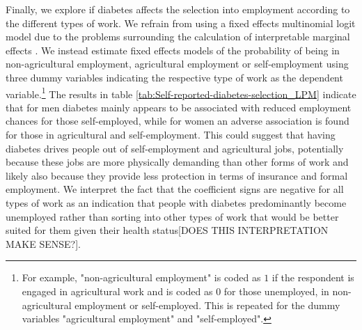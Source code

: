 \documentclass[12pt,english,british]{article}
\begin{document}
Finally, we explore if diabetes affects the selection into employment according to the different types of work. We refrain from using a fixed effects multinomial logit model due to the problems surrounding the calculation of interpretable marginal effects \citep{Pforr2014}. We instead estimate fixed effects models of the probability of being in non-agricultural employment, agricultural employment or self-employment using three dummy variables indicating the respective type of work as the dependent variable.\footnote{For example, "non-agricultural employment" is coded as $1$ if the respondent is engaged in agricultural work and is coded as $0$ for those unemployed, in non-agricultural employment or self-employed. This is repeated for the dummy variables "agricultural employment" and "self-employed".} The results in table \ref{tab:Self-reported-diabetes-selection_LPM} indicate that for men diabetes mainly appears to be associated with reduced employment chances for those self-employed, while for women an adverse association is found for those in agricultural and self-employment. This could suggest that having diabetes drives people out of self-employment and agricultural jobs, potentially because these jobs are more physically demanding than other forms of work and likely also because they provide less protection in terms of insurance and formal employment. We interpret the fact that the coefficient signs are negative for all types of work as an indication that people with diabetes predominantly become unemployed rather than sorting into other types of work that would be better suited for them given their health status[DOES THIS INTERPRETATION MAKE SENSE?].
\end{document}
